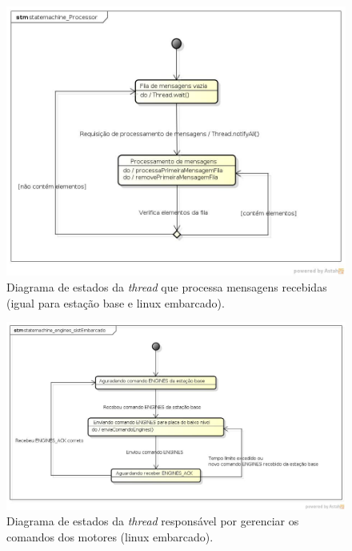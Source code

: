 \begin{figure}[H]
  \centering
  \includegraphics[width=\textwidth, keepaspectratio]{./figuras/statemachine_Processor.jpg}
  \caption{Diagrama de estados da \textit{thread} que processa mensagens recebidas (igual para estação base e linux embarcado).}
  \label{fig:diagrama_estados_processor}
\end{figure}

\begin{figure}[H]
  \centering
  \includegraphics[width=\textwidth, keepaspectratio]{./figuras/sistEmbarcado/statemachine_motores_sistEmbarcado.jpg}
  \caption{Diagrama de estados da \textit{thread} responsável por gerenciar os comandos dos motores (linux embarcado).}
  \label{fig:diagrama_estados_motores_sist_embarcado}
\end{figure}

